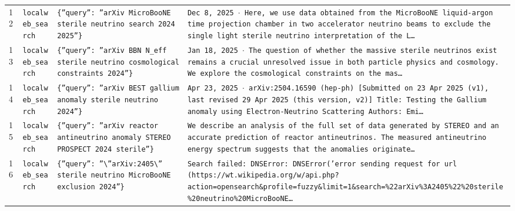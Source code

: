 \documentclass[11pt,a4paper]{article}
\begin{document}
\begin{longtable}{@{}p{}p{}p{}p{}@{}}
12 & \texttt{local}\newline\texttt{web\_\allowbreak{}search} & \texttt{\{''query'':\allowbreak{} ''arXiv MicroBooNE sterile neutrino search 2024 2025''\}\allowbreak{}} & \texttt{Dec 8,\allowbreak{} 2025 $\cdot$ Here,\allowbreak{} we use data obtained from the MicroBooNE liquid-argon time projection chamber in two accelerator neutrino beams to exclude the single light sterile neutrino interpretation of the L\ldots{}\allowbreak{}} \\
13 & \texttt{local}\newline\texttt{web\_\allowbreak{}search} & \texttt{\{''query'':\allowbreak{} ''arXiv BBN N\_\allowbreak{}eff sterile neutrino cosmological constraints 2024''\}\allowbreak{}} & \texttt{Jan 18,\allowbreak{} 2025 $\cdot$ The question of whether the massive sterile neutrinos exist remains a crucial unresolved issue in both particle physics and cosmology. We explore the cosmological constraints on the mas\ldots{}\allowbreak{}} \\
14 & \texttt{local}\newline\texttt{web\_\allowbreak{}search} & \texttt{\{''query'':\allowbreak{} ''arXiv BEST gallium anomaly sterile neutrino 2024''\}\allowbreak{}} & \texttt{Apr 23,\allowbreak{} 2025 $\cdot$ arXiv:\allowbreak{}2504.16590 (hep-ph)\allowbreak{} [Submitted on 23 Apr 2025 (v1)\allowbreak{},\allowbreak{} last revised 29 Apr 2025 (this version,\allowbreak{} v2)\allowbreak{}]\allowbreak{} Title:\allowbreak{} Testing the Gallium anomaly using Electron-Neutrino Scattering Authors:\allowbreak{} Emi\ldots{}\allowbreak{}} \\
15 & \texttt{local}\newline\texttt{web\_\allowbreak{}search} & \texttt{\{''query'':\allowbreak{} ''arXiv reactor antineutrino anomaly STEREO PROSPECT 2024 sterile''\}\allowbreak{}} & \texttt{We describe an analysis of the full set of data generated by STEREO and an accurate prediction of reactor antineutrinos. The measured antineutrino energy spectrum suggests that the anomalies originate\ldots{}\allowbreak{}} \\
16 & \texttt{local}\newline\texttt{web\_\allowbreak{}search} & \texttt{\{''query'':\allowbreak{} ''\textbackslash{}\allowbreak{}''arXiv:\allowbreak{}2405\textbackslash{}\allowbreak{}'' sterile neutrino MicroBooNE exclusion 2024''\}\allowbreak{}} & \texttt{Search failed:\allowbreak{} DNSError:\allowbreak{} DNSError('error sending request for url (https:\allowbreak{}/\allowbreak{}/\allowbreak{}wt.wikipedia.org/\allowbreak{}w/\allowbreak{}api.php?action=\allowbreak{}opensearch\&profile=\allowbreak{}fuzzy\&limit=\allowbreak{}1\&search=\allowbreak{}\%22arXiv\%3A2405\%22\%20sterile\%20neutrino\%20MicroBooNE\ldots{}\allowbreak{}} \\

\end{longtable}
\end{document}
